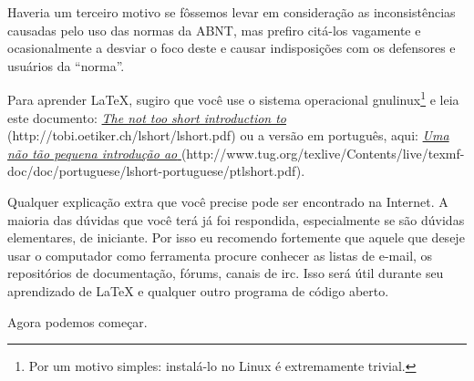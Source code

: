 Haveria um terceiro motivo se fôssemos levar em consideração as inconsistências causadas pelo uso das normas da ABNT, mas prefiro citá-los vagamente e ocasionalmente a desviar o foco deste e causar indisposições com os defensores e usuários da ``norma''.

Para aprender \LaTeX{}, sugiro que você use o sistema operacional \gls{gnulinux}\footnote{Por um motivo simples: instalá-lo no Linux é extremamente trivial.} e leia este documento: \href{http://tobi.oetiker.ch/lshort/lshort.pdf}{\emph{The not too short introduction to \LaTeXe{}}} ({\sf http://tobi.oetiker.ch/lshort/lshort.pdf}) ou a versão em português, aqui: \href{http://www.tug.org/texlive/Contents/live/texmf-doc/doc/portuguese/lshort-portuguese/ptlshort.pdf}{\emph{Uma não tão pequena introdução ao \LaTeXe}} ({\sf http://www.tug.org/texlive/Contents/live/texmf-doc/doc/portuguese/lshort-portuguese/ptlshort.pdf}).

Qualquer explicação extra que você precise pode ser encontrado na Internet. A maioria das dúvidas que você terá já foi respondida, especialmente se são dúvidas elementares, de iniciante. Por isso eu recomendo fortemente que aquele que deseje usar o computador como ferramenta procure conhecer as listas de e-mail, os repositórios de documentação, fórums, canais de \gls{irc}. Isso será útil durante seu aprendizado de \LaTeX{} e qualquer outro programa de código aberto.

Agora podemos começar.
